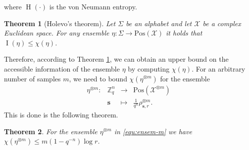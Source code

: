 \documentclass[11pt]{article}
\theoremstyle{plain}
\newtheorem{theorem}{Theorem}
\theoremstyle{definition}
\DeclareMathOperator{\entpy}{H}
\def\Z{\mathbb{Z}}
\def\X{\mathcal{X}}
\begin{document}
where $\entpy(\cdot)$ is the von Neumann entropy.
\begin{theorem}[Holevo's theorem]
    \label{thm:holevo}
    Let $\Sigma$ be an alphabet and let $\X$ be a complex Euclidean space. For any ensemble $\eta: \Sigma \rightarrow \mathrm{Pos}(\X)$ it holds that $\operatorname{I}(\eta) \le \chi(\eta)$.
\end{theorem}
Therefore, according to Theorem \ref{thm:holevo}, we can obtain an upper bound on the accessible information of the ensemble $\eta$ by computing $\chi(\eta)$. For an arbitrary number of samples $m$, we need to bound $\chi(\eta^{\otimes m})$ for the ensemble
\begin{equation}
    \label{equ:ensem-m}
    \begin{array}{rrll}
        \eta^{\otimes m}: & \Z_q^n & \longrightarrow & \mathrm{Pos}(\X^{\otimes m}) \\
        & \bm{s} & \longmapsto & \frac{1}{q^n}\rho_{\bm{s}, r}^{\otimes m}.
    \end{array}
\end{equation}
This is done is the following theorem.
\begin{theorem}
    \label{thm:acc-bound}
    For the ensemble $\eta^{\otimes m}$ in \eqref{equ:ensem-m} we have $\chi(\eta^{\otimes m}) \le m(1 - q^{-n})\log r$.
\end{theorem}
\end{document}
